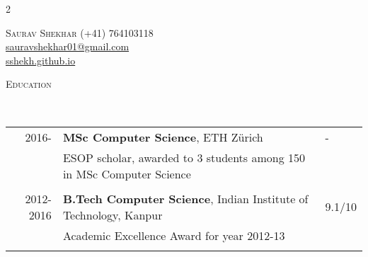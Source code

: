 \documentclass[9pt]{article}
\renewcommand{\arraystretch}{1.5}
\newenvironment{changemargin}[2]{%
  \begin{list}{}{%
    \setlength{\topsep}{0pt}%
    \setlength{\leftmargin}{#1}%
    \setlength{\rightmargin}{#2}%
    \setlength{\listparindent}{\parindent}%
    \setlength{\itemindent}{\parindent}%
    \setlength{\parsep}{\parskip}%
  }%
  \item[]}{\end{list}
}
\newcommand{\lineover}{
	\begin{changemargin}{-0.05in}{-0.10in}
		\vspace*{-9pt}
		\hrulefill \\
		\vspace*{-2pt}
	\end{changemargin}
}
\newcommand{\header}[1]{
	\begin{changemargin}{-0.5in}{-0.5in}
		\scshape{#1}\\
  	\lineover
	\end{changemargin}
}
\newcommand{\name}[1]{
	  	{\LARGE \scshape {#1}}
}
\newcommand{\contact}[4]{
	\begin{changemargin}{-0.65in}{-0.65in}
		\begin{multicols}{2}
			\name{{#1}}\vfill\null %
			\columnbreak
			{#2}\\	
			{#3}\\ 
			{#4}\\ 
		\end{multicols}
	\end{changemargin}
}
\begin{document}
\contact{Saurav Shekhar}
{{\hspace{180pt}}(+41) 764103118}
{{\hspace{130pt}} \href{mailto:sauravshekhar01@gmail.com}{sauravshekhar01@gmail.com}}
{{\hspace{180pt}} \href{https://sshekh.github.io/}{sshekh.github.io}}  
 
\header{Education}

\vspace{4pt}
	\renewcommand{\arraystretch}{1}
	\begin{tabular}{rll}
	2016- & \textbf{MSc Computer Science},  ETH Z{\"u}rich  &- \\
		  & ESOP scholar, awarded to 3 students among 150 in MSc Computer Science &\\\\
2012-2016 & \textbf{B.Tech Computer Science},  Indian Institute of Technology, Kanpur & 9.1/10 \\ 
		  &  Academic Excellence Award for year 2012-13 & \\\\
	\end{tabular}

\end{document}
